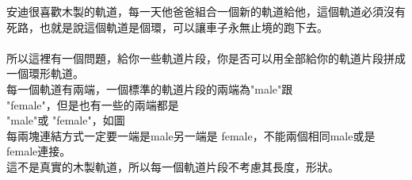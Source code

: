 安迪很喜歡木製的軌道，每一天他爸爸組合一個新的軌道給他，這個軌道必須沒有死路，也就是說這個軌道是個環，可以讓車子永無止境的跑下去。\\
\\
所以這裡有一個問題，給你一些軌道片段，你是否可以用全部給你的軌道片段拼成一個環形軌道。\\
每一個軌道有兩端，一個標準的軌道片段的兩端為"male"跟\\
"female"，但是也有一些的兩端都是\\
"male"或 "female"，如圖\\
每兩塊連結方式一定要一端是male另一端是 female，不能兩個相同male或是\\
female連接。\\
這不是真實的木製軌道，所以每一個軌道片段不考慮其長度，形狀。\\
